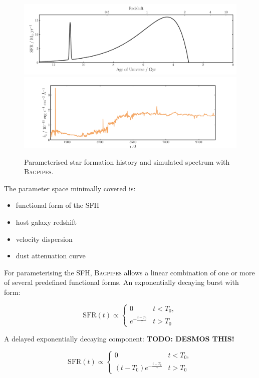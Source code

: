 \documentclass[a4paper,11pt]{article}
\begin{document}
\begin{figure}[H]
  \includegraphics[width=\textwidth]{alex_model_20_sfh}
  \includegraphics[width=\textwidth]{alex_model_20_spec}
  \caption{Parameterised star formation history and simulated spectrum with \textsc{Bagpipes}.}
  \label{fig:bagpipes_example_simulation}
\end{figure}

The parameter space minimally covered is:

\begin{itemize}
  \item functional form of the SFH
  \item host galaxy redshift
  \item velocity dispersion
  \item dust attenuation curve
\end{itemize}

\noindent For parameterising the SFH, \textsc{Bagpipes} allows a linear combination of one or more of several predefined functional forms. An exponentially decaying burst with form:

\begin{equation}
  \mathrm{SFR}(t) \propto
  \begin{cases}
    0 & t < T_0, \\
    e^{-\frac{t-T_0}{\tau}} & t > T_0
  \end{cases}
\end{equation}

\noindent A delayed exponentially decaying component: \textbf{TODO: DESMOS THIS!}

\begin{equation}
  \mathrm{SFR}(t) \propto
  \begin{cases}
    0 & t < T_0, \\
    (t-T_0)e^{-\frac{t-T_0}{\tau}} & t > T_0
  \end{cases}
\end{equation}
\end{document}
